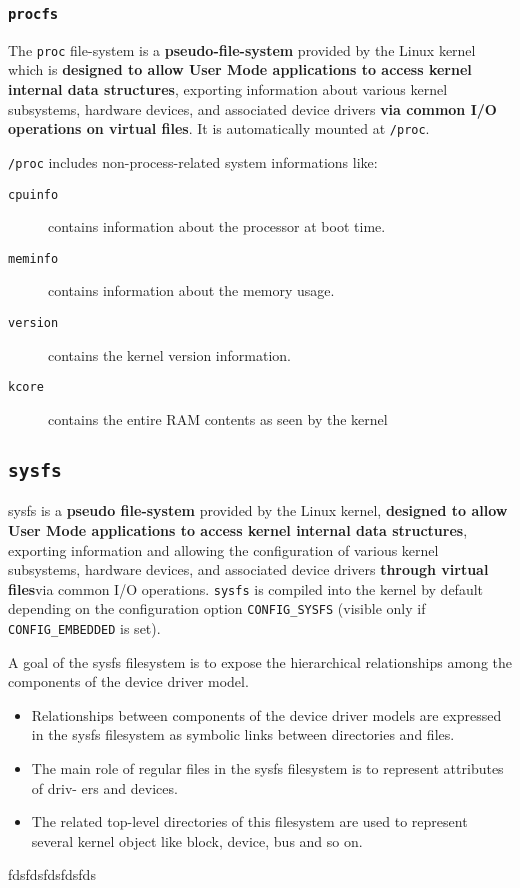 \documentclass[10pt,a4paper]{article}
\begin{document}
\subsubsection{\texttt{procfs}}

The \texttt{proc} file-system is a \textbf{pseudo-file-system} provided by the Linux kernel which is \textbf{designed to allow User Mode applications to access kernel internal data structures}, exporting information about various kernel subsystems, hardware devices, and associated device drivers \textbf{via common I/O operations on virtual files}. It is automatically mounted at \texttt{/proc}. 

\texttt{/proc} includes non-process-related system informations like:

\begin{description}
\item[\texttt{cpuinfo}] contains information about the processor at boot time.
\item[\texttt{meminfo}] contains information about the memory usage.
\item[\texttt{version}] contains the kernel version information.
\item[\texttt{kcore}] contains the entire RAM contents as seen by the kernel
\end{description}









\subsection{\texttt{sysfs}}

sysfs is a \textbf{pseudo file-system} provided by the Linux kernel, \textbf{designed to allow User Mode applications to access kernel internal data structures}, exporting information and allowing the configuration of various kernel subsystems, hardware devices, and associated device drivers \textbf{through virtual files}via common I/O operations. \texttt{sysfs} is compiled into the kernel by default depending on the configuration option \texttt{CONFIG\_SYSFS} (visible only if \texttt{CONFIG\_EMBEDDED} is set).


A goal of the sysfs filesystem is to expose the hierarchical relationships among the components of the device driver model. 
\begin{itemize}
\item Relationships between components of the device driver models are expressed in the sysfs filesystem as symbolic links between directories and files.
\item The main role of regular files in the sysfs filesystem is to represent attributes of driv-
ers and devices. 
\item The related top-level directories of this filesystem are used to represent several kernel object like block, device, bus and so on.

\end{itemize}

fdsfdsfdsfdsfds
\end{document}
